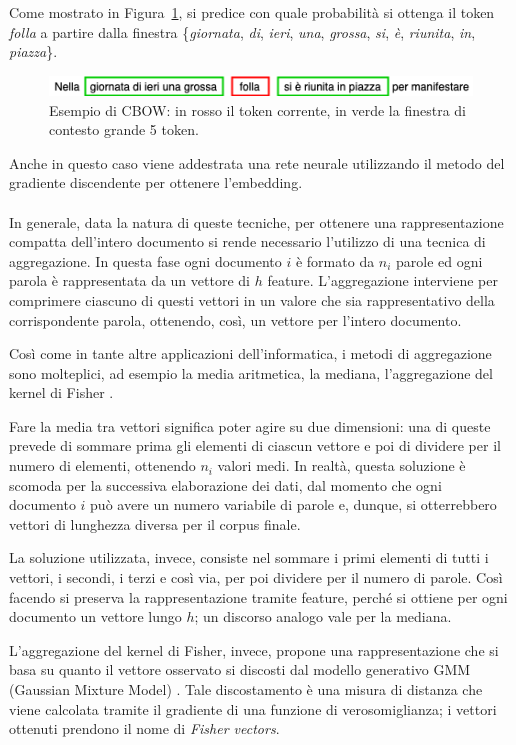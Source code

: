\documentclass[12pt]{report}
\theoremstyle{definition}
\begin{document}
Come mostrato in Figura~\ref{cbow}, si predice con quale probabilità si ottenga il token \textit{folla} a partire dalla finestra \{\textit{giornata}, \textit{di}, \textit{ieri}, \textit{una}, \textit{grossa}, \textit{si}, \textit{è}, \textit{riunita}, \textit{in}, \textit{piazza}\}.
\begin{figure}
    \centering
    \includegraphics[scale = 0.7]{images/cbow.png}
    \caption{Esempio di CBOW: in rosso il token corrente, in verde la finestra di contesto grande 5 token.}
    \label{cbow}
\end{figure}
Anche in questo caso viene addestrata una rete neurale utilizzando il metodo del gradiente discendente per ottenere l'embedding.
\\
\\
In generale, data la natura di queste tecniche, per ottenere una rappresentazione compatta dell'intero documento si rende necessario l'utilizzo di una tecnica di aggregazione.
In questa fase ogni documento $i$ è formato da $n_i$ parole ed ogni parola è rappresentata da un vettore di $h$ feature. L'aggregazione interviene per comprimere ciascuno di questi vettori in un valore che sia rappresentativo della corrispondente parola, ottenendo, così, un vettore per l'intero documento.

Così come in tante altre applicazioni dell'informatica, i metodi di aggregazione sono molteplici, ad esempio la media aritmetica, la mediana, l'aggregazione del kernel di Fisher \cite{19}.

Fare la media tra vettori significa poter agire su due dimensioni: una di queste prevede di sommare prima gli elementi di ciascun vettore e poi di dividere per il numero di elementi, ottenendo $n_i$ valori medi. In realtà, questa soluzione è scomoda per la successiva elaborazione dei dati, dal momento che ogni documento $i$ può avere un numero variabile di parole e, dunque, si otterrebbero vettori di lunghezza diversa per il corpus finale.

La soluzione utilizzata, invece, consiste nel sommare i primi elementi di tutti i vettori, i secondi, i terzi e così via, per poi dividere per il numero di parole. Così facendo si preserva la rappresentazione tramite feature, perché si ottiene per ogni documento un vettore lungo $h$; un discorso analogo vale per la mediana.

L'aggregazione del kernel di Fisher, invece, propone una rappresentazione che si basa su quanto il vettore osservato si discosti dal modello generativo GMM (Gaussian Mixture Model) \cite{37}. Tale discostamento è una misura di distanza che viene calcolata tramite il gradiente di una funzione di verosomiglianza; i vettori ottenuti prendono il nome di \textit{Fisher vectors}.
\end{document}
